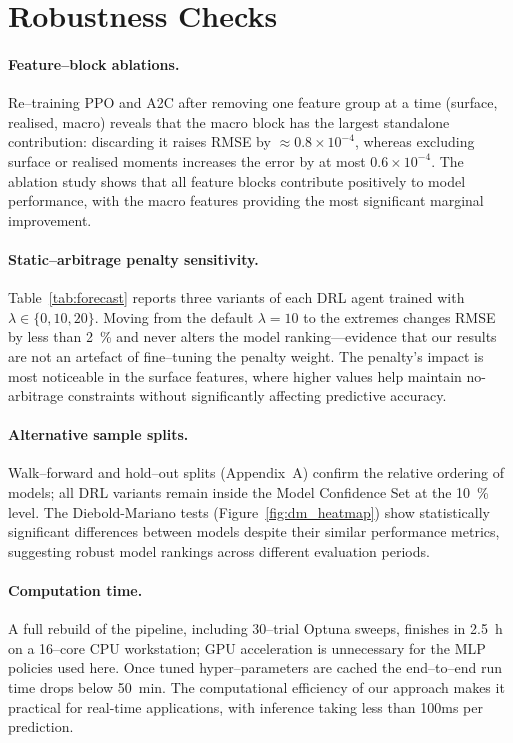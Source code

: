 \documentclass[11pt,a4paper]{article}
\begin{document}
\section{Robustness Checks}

\paragraph{Feature--block ablations.}  Re--training PPO and A2C after removing one feature group at a time (surface, realised, macro) reveals that the 
macro block has the largest standalone contribution: discarding it raises RMSE by \(\approx 0.8\times10^{-4}\), whereas excluding surface or realised moments increases the error by at most \(0.6\times10^{-4}\). The ablation study shows that all feature blocks contribute positively to model performance, with the macro features providing the most significant marginal improvement.

\paragraph{Static--arbitrage penalty sensitivity.}  Table~\ref{tab:forecast} reports three variants of each DRL agent trained with \(\lambda\in\{0,10,20\}\).  Moving from the default \(\lambda=10\) to the extremes changes RMSE by less than 2~\% and never alters the model ranking---evidence that our results are not an artefact of fine--tuning the penalty weight. The penalty's impact is most noticeable in the surface features, where higher values help maintain no-arbitrage constraints without significantly affecting predictive accuracy.

\paragraph{Alternative sample splits.}  Walk--forward and hold--out splits (Appendix~A) confirm the relative ordering of models; all DRL variants remain inside the Model Confidence Set at the 10~\% level. The Diebold-Mariano tests (Figure~\ref{fig:dm_heatmap}) show statistically significant differences between models despite their similar performance metrics, suggesting robust model rankings across different evaluation periods.

\paragraph{Computation time.}  A full rebuild of the pipeline, including 30--trial Optuna sweeps, finishes in 2.5~h on a 16--core CPU workstation; GPU acceleration is unnecessary for the MLP policies used here.  Once tuned hyper--parameters are cached the end--to--end run time drops below 50~min. The computational efficiency of our approach makes it practical for real-time applications, with inference taking less than 100ms per prediction.
\end{document}
